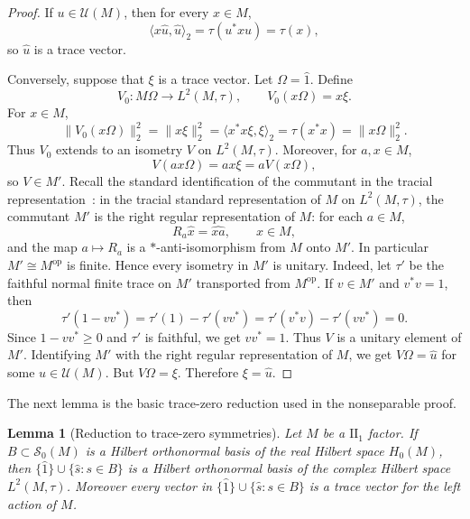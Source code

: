 \documentclass[11pt,letterpaper,reqno]{amsart}
\newtheorem{lem}[thm]{Lemma}
\theoremstyle{definition}
\numberwithin{equation}{section}
\newcommand{\one}{1}
\begin{document}
	\begin{proof}
	If \(u\in\mathcal U(M)\), then for every \(x\in M\),
	\[
	   \langle x\widehat{u},\widehat{u}\rangle_2
	   =\tau(u^*xu)
	   =\tau(x),
	\]
	so \(\widehat{u}\) is a trace vector.
	
Conversely, suppose that \(\xi\) is a trace vector. Let
\(\Omega=\widehat{1}\). Define
\[
   V_0:M\Omega\to L^2(M,\tau),
   \qquad
   V_0(x\Omega)=x\xi .
\]
For \(x\in M\),
	\[
	   \|V_0(x\Omega)\|_2^2
	   =\|x\xi\|_2^2
	   =\langle x^*x\xi,\xi\rangle_2
	   =\tau(x^*x)
	   =\|x\Omega\|_2^2.
	\]
	Thus \(V_0\) extends to an isometry \(V\) on \(L^2(M,\tau)\). Moreover, for
	\(a,x\in M\),
	\[
	   V(ax\Omega)=ax\xi=aV(x\Omega),
	\]
	so \(V\in M'\). Recall the standard identification of the commutant in the tracial
representation~\cite{Tak02}: in the tracial standard representation of
\(M\) on \(L^2(M,\tau)\), the commutant \(M'\) is the right regular
representation of \(M\): for each \(a\in M\),
\[
   R_a\widehat{x}=\widehat{xa},\qquad x\in M,
\]
and the map \(a\mapsto R_a\) is a \(*\)-anti-isomorphism from \(M\) onto
\(M'\). In particular \(M'\cong M^{\mathrm{op}}\) is finite.  Hence every isometry in
\(M'\) is unitary.  Indeed, let \(\tau'\) be the faithful normal finite trace
on \(M'\) transported from \(M^{\mathrm{op}}\).  If \(v\in M'\) and
\(v^*v=\one\), then
\[
   \tau'(\one-vv^*)
   =
   \tau'(\one)-\tau'(vv^*)
   =
   \tau'(v^*v)-\tau'(vv^*)
   =
   0 .
\]
Since \(\one-vv^*\ge0\) and \(\tau'\) is faithful, we get \(vv^*=\one\).
Thus \(V\) is a unitary element of \(M'\). Identifying
	\(M'\) with the right regular representation of \(M\), we get
	\(V\Omega=\widehat{u}\) for some \(u\in\mathcal U(M)\). But \(V\Omega=\xi\).
	Therefore \(\xi=\widehat{u}\).
	\end{proof}

The next lemma is the basic trace-zero reduction used in the nonseparable proof.

\begin{lem}[Reduction to trace-zero symmetries]\label{lem:trace-zero-reduction}
Let $M$ be a $\mathrm{II}_1$ factor.  If $B\subset\mathcal S_0(M)$ is a Hilbert orthonormal basis of the real Hilbert space $H_0(M)$, then $\{\widehat{\one}\}\cup\{\widehat{s}:s\in B\}$ is a Hilbert orthonormal basis of the complex Hilbert space $L^2(M,\tau)$.  Moreover every vector in $\{\widehat{\one}\}\cup\{\widehat{s}:s\in B\}$ is a trace vector for the left action of $M$.
\end{lem}
\end{document}

